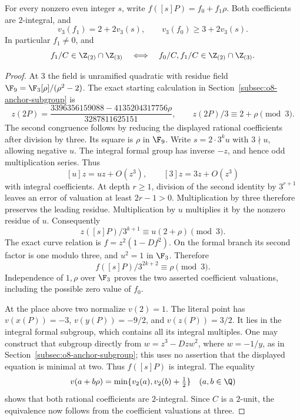 \begin{lemma}\label{lem:v12-anchor-coefficient}
For every nonzero even integer $s$, write
$f([s]P)=f_0+f_1\rho$.  Both coefficients are $2$-integral, and
\[
 v_3(f_1)=2+2v_3(s),\qquad
 v_3(f_0)\ge3+2v_3(s).
\]
In particular $f_1\ne0$, and
\[
 f_1/C\in\Z_{(2)}\cap\Z_{(3)}
 \quad\Longleftrightarrow\quad
 f_0/C,f_1/C\in\Z_{(2)}\cap\Z_{(3)}.
\]
\end{lemma}
\begin{proof}
At $3$ the field is unramified quadratic with residue field
$\F_9=\F_3[\rho]/(\rho^2-2)$.  The exact starting calculation in
Section~\ref{subsec:o8-anchor-subgroup} is
\[
 z(2P)=
 \frac{3396356159088-4135204317756\rho}{3287811625151},
 \qquad z(2P)/3\equiv2+\rho\pmod3.
\]
The second congruence follows by reducing the displayed rational
coefficients after division by three.  Its square is $\rho$ in
$\F_9$.  Write $s=2\cdot3^k u$ with $3\nmid u$, allowing negative $u$.
The integral formal group has inverse $-z$, and hence odd
multiplication series.  Thus
\[
 [u]z=uz+O(z^3),\qquad [3]z=3z+O(z^3)
\]
with integral coefficients.  At depth $r\ge1$, division of the second
identity by $3^{r+1}$ leaves an error of valuation at least $2r-1>0$.
Multiplication by three therefore preserves the leading residue.
Multiplication by $u$ multiplies it by the nonzero residue of $u$.
Consequently
\[
 z([s]P)/3^{k+1}\equiv u(2+\rho)\pmod3.
\]
The exact curve relation is $f=z^2(1-Df^2)$.  On the formal branch its
second factor is one modulo three, and $u^2=1$ in $\F_3$.  Therefore
\[
 f([s]P)/3^{2k+2}\equiv\rho\pmod3.
\]
Independence of $1,\rho$ over $\F_3$ proves the two asserted
coefficient valuations, including the possible zero value of $f_0$.

At the place above two normalize $v(2)=1$.  The literal point has
$v(x(P))=-3$, $v(y(P))=-9/2$, and $v(z(P))=3/2$.  It lies in the
integral formal subgroup, which contains all its integral multiples.
One may construct that subgroup directly from
$w=z^3-Dzw^2$, where $w=-1/y$, as in
Section~\ref{subsec:o8-anchor-subgroup}; this uses no assertion that
the displayed equation is minimal at two.  Thus $f([s]P)$ is integral.
The equality
\[
 v(a+b\rho)=\min\{v_2(a),v_2(b)+\tfrac12\}\quad(a,b\in\Q)
\]
shows that both rational coefficients are $2$-integral.
Since $C$ is a $2$-unit, the equivalence now follows from the
coefficient valuations at three.
\end{proof}

